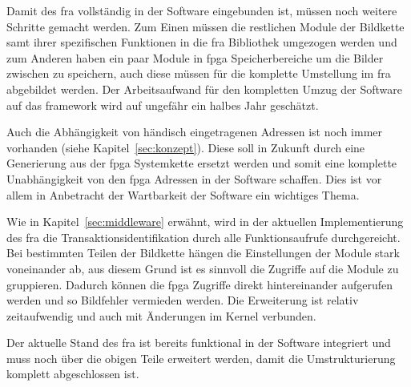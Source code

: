 
Damit des \ac{fra} vollständig in der Software eingebunden ist, müssen noch weitere Schritte gemacht werden. Zum Einen müssen die restlichen Module der Bildkette samt ihrer spezifischen Funktionen in die \ac{fra} Bibliothek umgezogen werden und zum Anderen haben ein paar Module in \ac{fpga} Speicherbereiche um die Bilder zwischen zu speichern, auch diese müssen für die komplette Umstellung im \ac{fra} abgebildet werden. Der Arbeitsaufwand für den kompletten Umzug der Software auf das \gls{framework} wird auf ungefähr ein halbes Jahr geschätzt.

Auch die Abhängigkeit von händisch eingetragenen Adressen ist noch immer vorhanden (siehe Kapitel~\ref{sec:konzept}). Diese soll in Zukunft durch eine Generierung aus der \ac{fpga} Systemkette ersetzt werden und somit eine komplette Unabhängigkeit von den \ac{fpga} Adressen in der Software schaffen. Dies ist vor allem in Anbetracht der Wartbarkeit der Software ein wichtiges Thema.

Wie in Kapitel~\ref{sec:middleware} erwähnt, wird in der aktuellen Implementierung des \ac{fra} die Transaktionsidentifikation durch alle Funktionsaufrufe durchgereicht. Bei bestimmten Teilen der Bildkette hängen die Einstellungen der Module stark voneinander ab, aus diesem Grund ist es sinnvoll die Zugriffe auf die Module zu gruppieren. Dadurch können die \ac{fpga} Zugriffe direkt hintereinander aufgerufen werden und so Bildfehler vermieden werden.
Die Erweiterung ist relativ zeitaufwendig und auch mit Änderungen im Kernel verbunden.


Der aktuelle Stand des \ac{fra} ist bereits funktional in der Software integriert und muss noch über die obigen Teile erweitert werden, damit die Umstrukturierung komplett abgeschlossen ist.



















